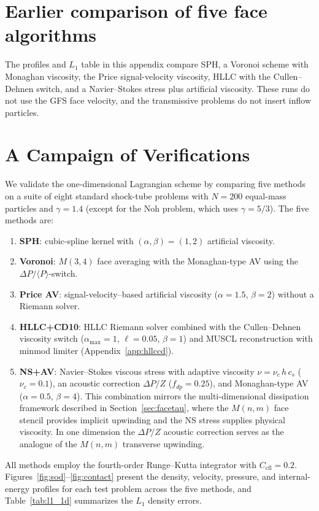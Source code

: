 \documentclass[twocolumn]{aastex63}
\begin{document}
\section{Earlier comparison of five face algorithms}
\label{app:fivemethods}
The profiles and $L_1$ table in this appendix compare SPH, a Voronoi scheme with Monaghan viscosity, the Price signal-velocity viscosity, HLLC with the Cullen--Dehnen switch, and a Navier--Stokes stress plus artificial viscosity. These runs do not use the GFS face velocity, and the transmissive problems do not insert inflow particles.

\section{A Campaign of Verifications}

We validate the one-dimensional Lagrangian scheme by comparing
five methods on a suite of eight standard shock-tube problems with
$N=200$ equal-mass particles and $\gamma=1.4$ (except for the
Noh problem, which uses $\gamma=5/3$).
The five methods are:
\begin{enumerate}
  \item \textbf{SPH}: cubic-spline kernel with
        $(\alpha,\beta)=(1,2)$ artificial viscosity.
  \item \textbf{Voronoi}: $M(3,4)$ face averaging
        with the Monaghan-type AV using
        the $\Delta P/\langle P\rangle$-switch.
  \item \textbf{Price AV}: signal-velocity--based
        artificial viscosity ($\alpha=1.5$, $\beta=2$)
        without a Riemann solver.
  \item \textbf{HLLC+CD10}: HLLC Riemann solver
        combined with the Cullen--Dehnen viscosity switch
        ($\alpha_\mathrm{max}=1$, $\ell=0.05$, $\beta=1$)
        and MUSCL reconstruction with minmod limiter
        (Appendix~\ref{app:hllccd}).
  \item \textbf{NS+AV}: Navier--Stokes viscous stress
        with adaptive viscosity
        $\nu = \nu_c\, h\, c_s$ ($\nu_c=0.1$),
        an acoustic correction $\Delta P / Z$ ($f_{dp}=0.25$),
        and Monaghan-type AV ($\alpha=0.5$, $\beta=4$).
        This combination mirrors the multi-dimensional
        dissipation framework described in
        Section~\ref{sec:facetau}, where the
        $M(n,m)$ face stencil provides implicit upwinding
        and the NS stress supplies physical viscosity.
        In one dimension the $\Delta P/Z$ acoustic correction
        serves as the analogue of the $M(n,m)$ transverse
        upwinding.
\end{enumerate}
All methods employ the fourth-order Runge--Kutta integrator
with $C_\mathrm{cfl}=0.2$.
Figures~\ref{fig:sod}--\ref{fig:contact} present the density,
velocity, pressure, and internal-energy profiles for each
test problem across the five methods, and
Table~\ref{tab:l1_1d} summarizes the $L_1$ density errors.
\end{document}
